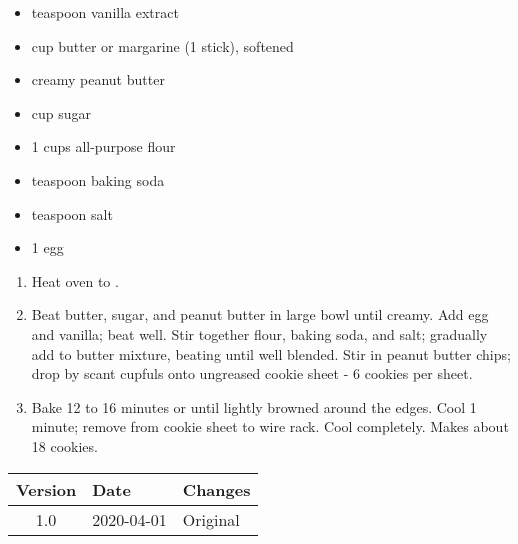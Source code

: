 
\ingredients
\begin{multicols}{2}
\raggedcolumns %
\begin{itemize}
    \item {} teaspoon vanilla extract
    \item {} cup butter or margarine (1 stick), softened
    \item {} creamy peanut butter
    \item {} cup sugar
    \item 1  cups all-purpose flour
    \item {} teaspoon baking soda
    \item {} teaspoon salt
    \item 1 egg
\end{itemize}
\end{multicols}

\instructions
\begin{enumerate}
    \item Heat oven to .
    \item Beat butter, sugar, and peanut butter in large bowl until creamy. Add egg and vanilla; beat well. Stir together flour, baking soda, and salt; gradually add to butter mixture, beating until well blended. Stir in peanut butter chips; drop by scant  cupfuls onto ungreased cookie sheet - 6 cookies per sheet.
    \item Bake 12 to 16 minutes or until lightly browned around the edges. Cool 1 minute; remove from cookie sheet to wire rack. Cool completely. Makes about 18 cookies.
\end{enumerate}

\vfill

\begin{tabular}{ c | l | l }
  \textbf{Version} & \textbf{Date} & \textbf{Changes} \\ 
  \hline		
  1.0 & 2020-04-01 & Original \\
\end{tabular}



